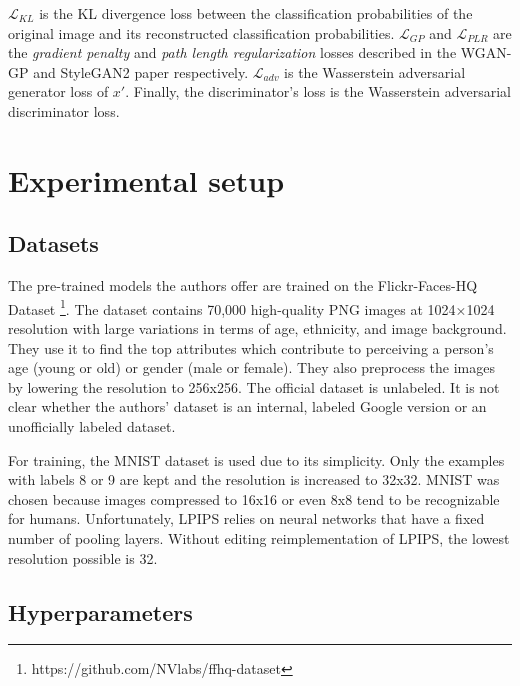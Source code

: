 $\mathcal{L}_{KL}$ is the KL divergence loss between the classification probabilities of the original image and its reconstructed classification probabilities. $\mathcal{L}_{GP}$ and $\mathcal{L}_{PLR}$ are the \textit{gradient penalty} and \textit{path length regularization} losses described in the WGAN-GP\cite{NIPS2017_892c3b1c} and StyleGAN2 paper\cite{Karras2020AnalyzingAI} respectively. $\mathcal{L}_{adv}$ is the Wasserstein adversarial generator loss of $x'$. Finally, the discriminator's loss is the Wasserstein adversarial discriminator loss.

\section{Experimental setup}

\subsection{Datasets}
   
The pre-trained models the authors offer are trained on the Flickr-Faces-HQ Dataset \cite{karras2019stylebased} \footnote{https://github.com/NVlabs/ffhq-dataset}. The dataset contains 70,000 high-quality PNG images at 1024×1024 resolution with large variations in terms of age, ethnicity, and image background. They use it to find the top attributes which contribute to perceiving a person's age (young or old) or gender (male or female). They also preprocess the images by lowering the resolution to 256x256. The official dataset is unlabeled. It is not clear whether the authors' dataset is an internal, labeled Google version or an unofficially labeled dataset.

For training, the MNIST \cite{deng2012mnist} dataset is used due to its simplicity. Only the examples with labels 8 or 9 are kept and the resolution is increased to 32x32. MNIST was chosen because images compressed to 16x16 or even 8x8 tend to be recognizable for humans. Unfortunately, LPIPS relies on neural networks that have a fixed number of pooling layers. Without editing reimplementation of LPIPS, the lowest resolution possible is 32.

\subsection{Hyperparameters} \label{sec:hyperparameters}

